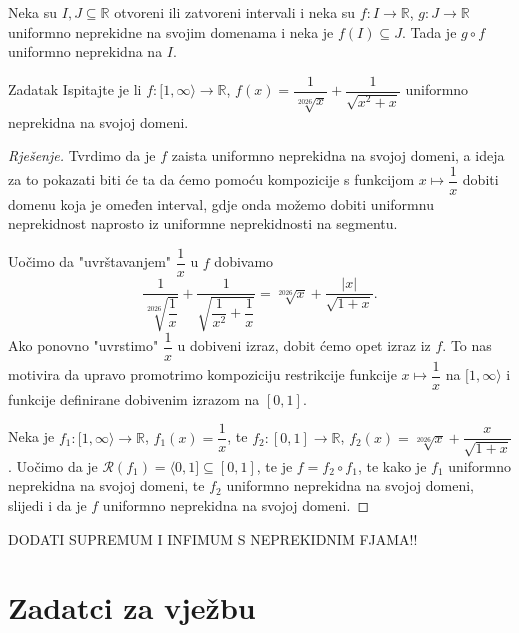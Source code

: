 \begin{remark}
Neka su \(I, J\subseteq \mathbb{R}\) otvoreni ili zatvoreni intervali i neka su \(f : I\to \mathbb{R}\), \(g : J\to \mathbb{R}\) uniformno neprekidne na svojim domenama i neka je \(f(I)\subseteq J\). Tada je \(g\circ f\) uniformno neprekidna na \(I\).
\end{remark}
\begin{exercise}{Zadatak}
Ispitajte je li \(f : [1, \infty\rangle\to \mathbb{R}\), \(f(x)=\dfrac{1}{\sqrt[2026]{x}}+\dfrac{1}{\sqrt{x^2+x}}\) uniformno neprekidna na svojoj domeni.
\end{exercise}
\begin{proof}[Rješenje]
Tvrdimo da je \(f\) zaista uniformno neprekidna na svojoj domeni, a ideja za to pokazati biti će ta da ćemo pomoću kompozicije s funkcijom \(x\mapsto \dfrac{1}{x}\) dobiti domenu koja je omeđen interval, gdje onda možemo dobiti uniformnu neprekidnost naprosto iz uniformne neprekidnosti na segmentu.

Uočimo da "uvrštavanjem" \(\dfrac{1}{x}\) u \(f\) dobivamo
\[\dfrac{1}{\sqrt[2026]{\dfrac{1}{x}}}+\dfrac{1}{\sqrt{\dfrac{1}{x^2}+\dfrac{1}{x}}}=\sqrt[2026]{x}+\dfrac{\left\lvert x\right\rvert}{\sqrt{1+x}}.\]
Ako ponovno "uvrstimo" \(\dfrac{1}{x}\) u dobiveni izraz, dobit ćemo opet izraz iz \(f\). To nas motivira da upravo promotrimo kompoziciju restrikcije funkcije \(x\mapsto \dfrac{1}{x}\) na \([1, \infty\rangle\) i funkcije definirane dobivenim izrazom na \([0, 1]\).

Neka je \(f_1 : [1, \infty\rangle\to \mathbb{R}\), \(f_1(x)=\dfrac{1}{x}\), te \(f_2 : [0, 1]\to \mathbb{R}\), \(f_2(x)=\sqrt[2026]{x}+\dfrac{x}{\sqrt{1+x}}\). Uočimo da je \(\mathcal{R}(f_1)=\langle 0, 1]\subseteq [0, 1]\), te je \(f=f_2\circ f_1\), te kako je \(f_1\) uniformno neprekidna na svojoj domeni, te \(f_2\) uniformno neprekidna na svojoj domeni, slijedi i da je \(f\) uniformno neprekidna na svojoj domeni.
\end{proof}
DODATI SUPREMUM I INFIMUM S NEPREKIDNIM FJAMA!!
\newpage
\section*{Zadatci za vježbu}
